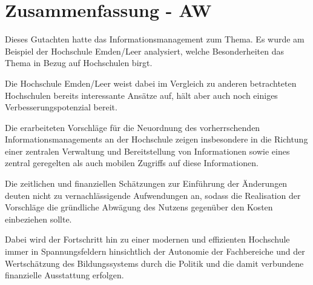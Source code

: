 \chapter{Zusammenfassung - AW}
Dieses Gutachten hatte das Informationsmanagement zum Thema. 
Es wurde am Beispiel der Hochschule Emden/Leer analysiert, welche 
Besonderheiten das Thema in Bezug auf Hochschulen birgt.

Die Hochschule Emden/Leer weist dabei im Vergleich zu anderen 
betrachteten Hochschulen bereits  interessante Ansätze auf, 
hält aber auch noch einiges Verbesserungspotenzial bereit. 

Die erarbeiteten Vorschläge für die Neuordnung des vorherrschenden 
Informationsmanagements an der Hochschule zeigen insbesondere 
in die Richtung einer zentralen Verwaltung und Bereitstellung von 
Informationen sowie eines zentral geregelten als auch mobilen 
Zugriffs auf diese Informationen.

Die zeitlichen und finanziellen Schätzungen zur Einführung der 
Änderungen deuten nicht zu vernachlässigende Aufwendungen an, 
sodass die Realisation der Vorschläge die gründliche Abwägung 
des Nutzens gegenüber den Kosten einbeziehen sollte. 

Dabei wird der Fortschritt hin zu einer modernen und effizienten 
Hochschule immer in  Spannungsfeldern hinsichtlich der Autonomie 
der Fachbereiche und der Wertschätzung des Bildungssystems 
durch die Politik und die damit verbundene finanzielle Ausstattung erfolgen.